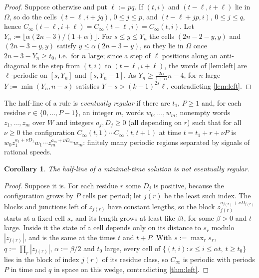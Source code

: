 \documentclass[3p]{elsarticle}
\newtheorem{corollary}[theorem]{Corollary}
\theoremstyle{definition}
\begin{document}
\begin{proof}
Suppose otherwise and put $\ell:=pq$. If $(t,i)$ and $(t-\ell,i+\ell)$ lie in
$\Omega$, so do the cells $(t-\ell,i+jq)$, $0\le j\le p$, and
$(t-\ell+jp,i)$, $0\le j\le q$, hence
$C_\infty(t-\ell,i+\ell)=C_\infty(t-\ell,i)=C_\infty(t,i)$. Let
$Y_n:=\lfloor\alpha(2n-3)/(1+\alpha)\rfloor$. For $s\le y\le Y_n$ the cells
$(2n-2-y,y)$ and $(2n-3-y,y)$ satisfy $y\le\alpha(2n-3-y)$, so they lie in
$\Omega$ once $2n-3-Y_n\ge t_0$, i.e.\ for $n$ large; since a step of $\ell$
positions along an anti-diagonal is the step from $(t,i)$ to
$(t-\ell,i+\ell)$, the words of \cref{lem:left} are $\ell$-periodic on
$[s,Y_n]$ and $[s,Y_n-1]$. As $Y_n\ge\frac{2\alpha}{1+\alpha}n-4$, for $n$
large $Y:=\min(Y_n,n-s)$ satisfies $Y-s>(k-1)^{2s}\ell$, contradicting
\cref{lem:left}.
\end{proof}

The half-line of a rule is \emph{eventually regular} if there are $t_1$,
$P\ge1$ and, for each residue $r\in\{0,\dots,P-1\}$, an integer $m$, words
$w_0,\dots,w_m$, nonempty words $z_1,\dots,z_m$ over $W$ and integers
$a_j,D_j\ge0$ (all depending on $r$) such that for all $\nu\ge0$ the
configuration $C_\infty(t,1)\cdots C_\infty(t,t+1)$ at time $t=t_1+r+\nu P$ is
$w_0z_1^{a_1+\nu D_1}w_1\cdots z_m^{a_m+\nu D_m}w_m$: finitely many periodic
regions separated by signals of rational speeds.

\begin{corollary}\label{cor:regular}
The half-line of a minimal-time solution is not eventually regular.
\end{corollary}

\begin{proof}
Suppose it is. For each residue $r$ some $D_j$ is positive, because the
configuration grows by $P$ cells per period; let $j(r)$ be the least such
index. The blocks and junctions left of $z_{j(r)}$ have constant lengths, so
the block $z_{j(r)}^{a_{j(r)}+\nu D_{j(r)}}$ starts at a fixed cell $s_r$ and its
length grows at least like $\beta t$, for some $\beta>0$ and $t$ large. Inside
it the state of a cell depends only on its distance to $s_r$ modulo
$|z_{j(r)}|$, and is the same at the times $t$ and $t+P$. With
$s:=\max_r s_r$, $q:=\prod_r|z_{j(r)}|$, $\alpha:=\beta/2$ and $t_0$ large,
every cell of $\{(t,i):s\le i\le\alpha t,\ t\ge t_0\}$ lies in the block of
index $j(r)$ of its residue class, so $C_\infty$ is periodic with periods $P$ in
time and $q$ in space on this wedge, contradicting \cref{thm:left}.
\end{proof}
\end{document}
